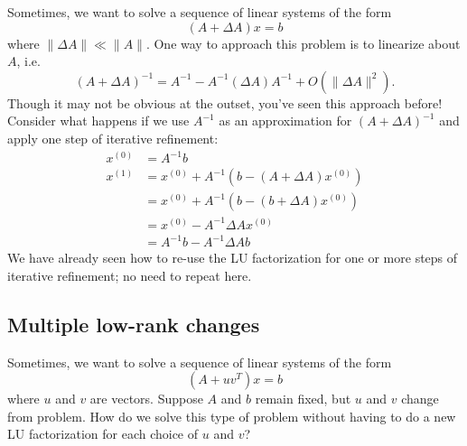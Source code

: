 \documentclass[12pt, leqno]{article}
\begin{document}
Sometimes, we want to solve a sequence of linear systems of the form
\[
  (A + \Delta A) x = b
\]
where $\|\Delta A\| \ll \|A\|$.  One way to approach this problem is
to linearize about $A$, i.e.
\[
  (A + \Delta A)^{-1} = A^{-1} - A^{-1} (\Delta A) A^{-1} + O(\|\Delta A\|^2).
\]
Though it may not be obvious at the outset, you've seen this approach
before!  Consider what happens if we use $A^{-1}$ as an approximation
for $(A+\Delta A)^{-1}$ and apply one step of iterative refinement:
\begin{align*}
  x^{(0)} &= A^{-1} b \\
  x^{(1)}
    &= x^{(0)} + A^{-1} \left( b - (A+\Delta A) x^{(0)} \right) \\
    &= x^{(0)} + A^{-1} \left( b - (b + \Delta A) x^{(0)} \right) \\
    &= x^{(0)} - A^{-1} \Delta A x^{(0)} \\
    &= A^{-1} b - A^{-1} \Delta A b
\end{align*}
We have already seen how to re-use the LU factorization for one or
more steps of iterative refinement; no need to repeat here.

\subsection{Multiple low-rank changes}

Sometimes, we want to solve a sequence of linear systems of the form
\[
  (A+uv^T) x = b
\]
where $u$ and $v$ are vectors.  Suppose $A$ and $b$ remain fixed,
but $u$ and $v$ change from problem.  How do we solve this type
of problem without having to do a new LU factorization for each
choice of $u$ and $v$?
\end{document}
